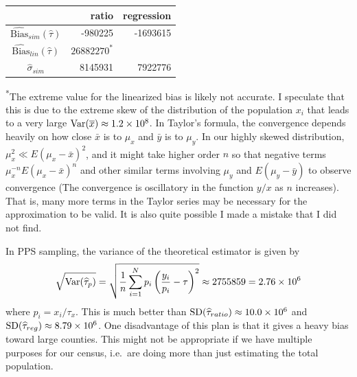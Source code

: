 \documentclass{homework}
\begin{document}
\begin{solution}
\begin{center}
\renewcommand{\arraystretch}{1.3}
\begin{tabular}{c| r r}
				      &   ratio & regression \\ \hline
$\hat{\mathrm{Bias}}_{sim}(\hat\tau)$ & -980225 &   -1693615 \\
$\hat{\mathrm{Bias}}_{lin}(\hat\tau)$ &$26882270^*$&            \\
$\hat\sigma_{sim}$		      & 8145931 &    7922776 \\
\end{tabular}
\end{center}

\textsuperscript{*}The extreme value for the linearized bias is likely not
accurate.  I speculate that this is due to the extreme skew of the distribution
of the population $x_i$ that leads to a very large $\mathrm{Var}(\overline x) \approx
1.2\times10^8$.  In Taylor's formula, the convergence depends heavily on how
close $\bar x$ is to $\mu_x$ and $\bar y$ is to $\mu_y$.  In our highly skewed
distribution, $\mu_x^2 \ll E(\mu_x - \bar x)^2$, and it might take higher order
$n$ so that negative terms $\mu_x^{-n}E(\mu_x - \bar x)^n$ and other similar terms
involving $\mu_y$ and $E(\mu_y - \bar y)$ to observe convergence (The convergence is oscillatory in the function $y/x$ as $n$ increases).  That is,
many more terms in the Taylor series may be necessary for the approximation to
be valid.  It is also quite possible I made a mistake that I did not find.
\end{solution}

\begin{solution}
  In PPS sampling, the variance of the theoretical estimator is given by
  $$
    \sqrt{\mathrm{Var}(\widehat \tau_p)} = \sqrt{\frac 1n\sum_{i=1}^N p_i\left(\frac{y_i}{p_i} - \tau\right)^2} \approx 2755859 = 2.76\times10^6
  $$
  where $p_i = x_i/\tau_x$.  This is much better than $\mathrm{SD}(\widehat\tau_{ratio})
  \approx 10.0\times10^6$ and $\mathrm{SD}(\widehat\tau_{reg})\approx 8.79\times10^6$.  One
  disadvantage of this plan is that it gives a heavy bias toward large
  counties.  This might not be appropriate if we have multiple purposes for our census, i.e.~are doing more than just estimating the total population.
  \end{solution}
\end{document}
